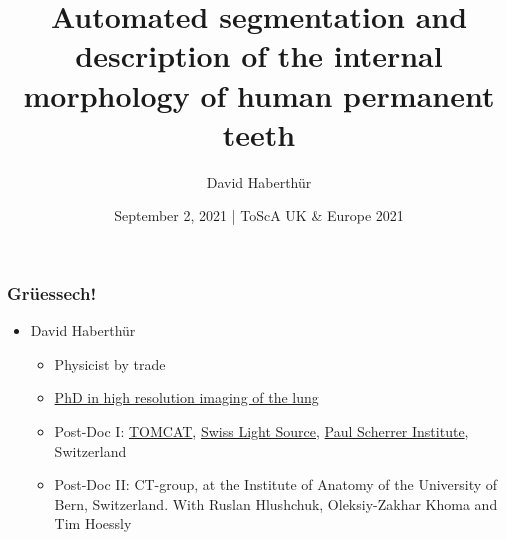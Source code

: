 \documentclass[aspectratio=169]{beamer}
\title{Automated segmentation and description of the internal morphology of human permanent teeth}
\author{David Haberthür}
\date{September 2, 2021 | ToScA UK \& Europe 2021}
\newcommand{\uct}{\si{\micro}CT\xspace}%
\begin{document}
{%
	\begin{frame}%
		\maketitle
	\end{frame}%
}

\begin{frame}[label=current]
	\frametitle{Grüessech!}
	\begin{itemize}
		\item David Haberthür
		\begin{itemize}
			\item Physicist by trade
			\item \href{https://boris.unibe.ch/2619/}{PhD in high resolution imaging of the lung}
			\item Post-Doc I: \href{https://www.psi.ch/sls/tomcat/}{TOMCAT}, \href{https://www.psi.ch/sls/}{Swiss Light Source}, \href{https://www.psi.ch/}{Paul Scherrer Institute}, Switzerland
			\item Post-Doc II: \uct-group, at the Institute of Anatomy of the University of Bern, Switzerland.
				With Ruslan Hlushchuk, Oleksiy-Zakhar Khoma and Tim Hoessly
		\end{itemize}
	\end{itemize}
\end{frame}
\end{document}
